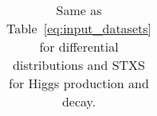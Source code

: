 \begin{table}[t]
\begin{tabular}{c|c|c|c|c|c}
    \bottomrule
    \end{tabular}
  \caption{\small Same as Table~\ref{eq:input_datasets} for
   differential distributions and STXS for Higgs production and decay.
     \label{eq:input_datasets_higgs}
  }
\end{table}

